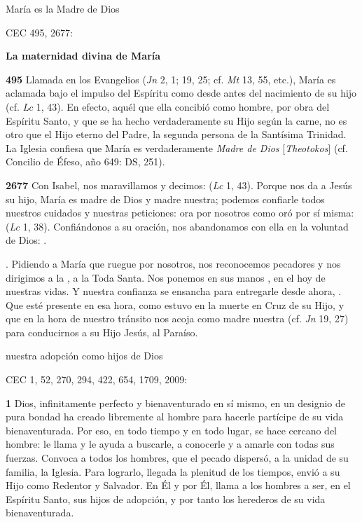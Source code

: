 María es la Madre de Dios

CEC 495, 2677:

\textbf{La maternidad divina de María}

\textbf{495} Llamada en los Evangelios  (\emph{Jn} 2, 1; 19, 25; cf. \emph{Mt} 13, 55, etc.), María es aclamada bajo el impulso del Espíritu como  desde antes del nacimiento de su hijo (cf. \emph{Lc} 1, 43). En efecto, aquél que ella concibió como hombre, por obra del Espíritu Santo, y que se ha hecho verdaderamente su Hijo según la carne, no es otro que el Hijo eterno del Padre, la segunda persona de la Santísima Trinidad. La Iglesia confiesa que María es verdaderamente \emph{Madre de Dios} {[}\emph{Theotokos}{]} (cf. Concilio de Éfeso, año 649: DS, 251).

\textbf{2677} \emph{} Con Isabel, nos maravillamos y decimos:  (\emph{Lc} 1, 43). Porque nos da a Jesús su hijo, María es madre de Dios y madre nuestra; podemos confiarle todos nuestros cuidados y nuestras peticiones: ora por nosotros como oró por sí misma:  (\emph{Lc} 1, 38). Confiándonos a su oración, nos abandonamos con ella en la voluntad de Dios: .

\emph{}. Pidiendo a María que ruegue por nosotros, nos reconocemos pecadores y nos dirigimos a la , a la Toda Santa. Nos ponemos en sus manos , en el hoy de nuestras vidas. Y nuestra confianza se ensancha para entregarle desde ahora, . Que esté presente en esa hora, como estuvo en la muerte en Cruz de su Hijo, y que en la hora de nuestro tránsito nos acoja como madre nuestra (cf. \emph{Jn} 19, 27) para conducirnos a su Hijo Jesús, al Paraíso.

nuestra adopción como hijos de Dios

CEC 1, 52, 270, 294, 422, 654, 1709, 2009:

\textbf{1} Dios, infinitamente perfecto y bienaventurado en sí mismo, en un designio de pura bondad ha creado libremente al hombre para hacerle partícipe de su vida bienaventurada. Por eso, en todo tiempo y en todo lugar, se hace cercano del hombre: le llama y le ayuda a buscarle, a conocerle y a amarle con todas sus fuerzas. Convoca a todos los hombres, que el pecado dispersó, a la unidad de su familia, la Iglesia. Para lograrlo, llegada la plenitud de los tiempos, envió a su Hijo como Redentor y Salvador. En Él y por Él, llama a los hombres a ser, en el Espíritu Santo, sus hijos de adopción, y por tanto los herederos de su vida bienaventurada.

